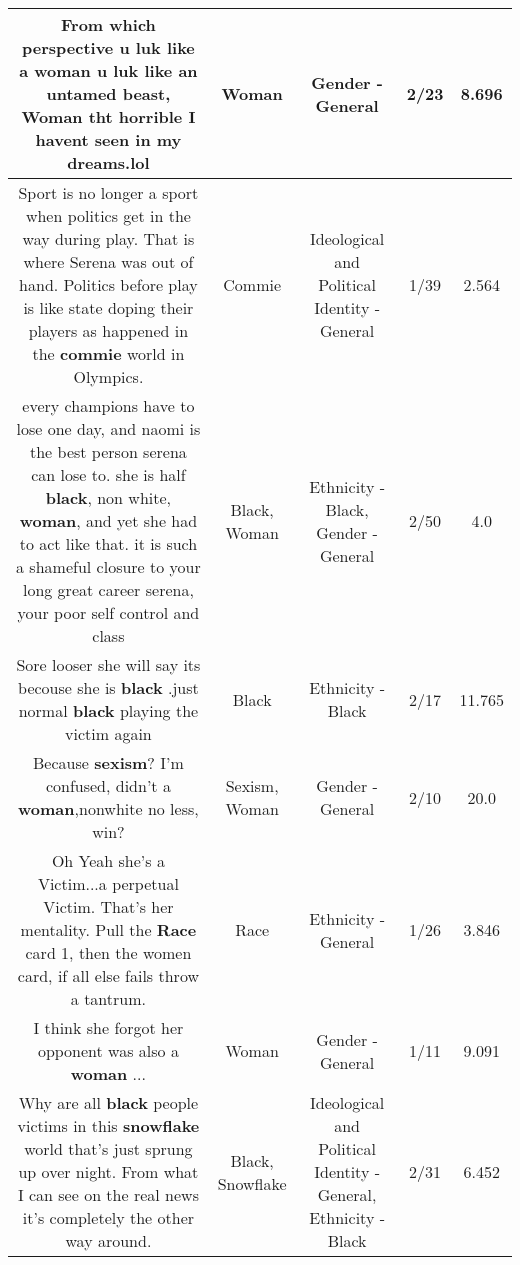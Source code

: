 \documentclass[11pt]{article}
\newlength\mylength
\begin{document}
\begin{center}
\begin{longtable}{|C{.65\mylength}|C{.30\mylength}|C{.12\mylength}|C{.12\mylength}|C{.12\mylength}|}
  \small From which perspective u luk like a \textbf{woman} u luk like an untamed beast, \textbf{Woman} tht horrible I havent seen in my dreams.lol\normalsize   & Woman & Gender - General & 2/23 & 8.696 \\  \hline
  \small Sport is no longer a sport when politics get in the way during play. That is where Serena was out of hand. Politics before play is like state doping their players as happened in the \textbf{commie} world in Olympics.\normalsize   & Commie &  Ideological and Political Identity - General & 1/39 & 2.564 \\  \hline
  \small every champions have to lose one day, and naomi is the best person serena can lose to. she is half \textbf{black}, non white, \textbf{woman}, and yet she had to act like that. it is such a shameful closure to your long great career serena, your poor self control and class\normalsize   & Black, Woman & Ethnicity - Black, Gender - General & 2/50 & 4.0 \\  \hline
  \small Sore looser she will say its becouse she is \textbf{black} .just normal \textbf{black} playing the victim again\normalsize   & Black & Ethnicity - Black & 2/17 & 11.765 \\  \hline
  \small Because \textbf{sexism}? I'm confused, didn't a  \textbf{woman},nonwhite no less, win?\normalsize   & Sexism, Woman & Gender - General & 2/10 & 20.0 \\  \hline
  \small Oh Yeah she's a Victim...a perpetual Victim. That's her mentality. Pull the \textbf{Race} card 1, then the women card, if all else fails throw a tantrum.\normalsize   & Race & Ethnicity - General & 1/26 & 3.846 \\  \hline
  \small I think she forgot her opponent was also a \textbf{woman} ...\normalsize   & Woman & Gender - General & 1/11 & 9.091 \\  \hline
  \small Why are all \textbf{black} people victims in this \textbf{snowflake} world that's just sprung up over night. From what I can see on the real news it's completely the other way around.\normalsize   & Black, Snowflake &  Ideological and Political Identity - General, Ethnicity - Black & 2/31 & 6.452 \\  \hline

\end{longtable}
\end{center}
\end{document}
